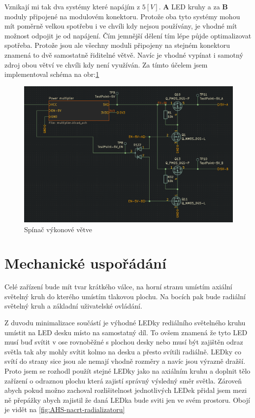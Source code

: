 Vznikají mi tak dva systémy které napájím z \(5 [V]\).
{\bf A} LED kruhy a za {\bf B} moduly připojené na modulovém konektoru.
Protože oba tyto systémy mohou mít poměrně velkou spotřebu i ve chvíli kdy nejsou používány, je vhodné mít možnost odpojit je od napájení.
Čím jemnější dělení tím lépe půjde optimalizovat spotřeba.
Protože jsou ale všechny moduli připojeny na stejném konektoru znamená to dvě samostatně řiditelné větvě.
Navíc je vhodné vypínat i samotný zdroj obou větví ve chvíli kdy není využíván.
Za tímto účelem jsem implementoval schéma na obr:\ref{fig:spinac_vikonove_vetve}

\begin{figure}[h!]
    \centering
    \includegraphics[width=\textwidth]{text/PraktickaCast/img/spinac_vikonove_vetve.png}
    \caption{Spínač výkonové větve}
    \label{fig:spinac_vikonove_vetve}
\end{figure}

\newpage

\section{Mechanické uspořádání}

Celé zařízení bude mít tvar krátkého válce, na horní stranu umístím axiální světelný kruh do kterého umístím tlakovou plochu.
Na bocích pak bude radiální světelný kruh a základní uživatelské ovládání.

Z duvodu minimalizace součástí je výhodné LEDky rediálního světelného kruhu umístit na LED desku místo na samostatný díl.
To ovšem znamená že tyto LED musí buď svítit v ose rovnoběžné s plochou desky nebo musí být zajištěn odraz světla tak aby mohly svítit kolmo na desku a přesto svítili radiálně.
LEDky co svítí do strany sice jsou ale nemají vhodně rozměry a navíc jsou výrazně dražší.
Proto jsem se rozhodl použít stejné LEDky jako na axiálním kruhu a doplnit tělo zařízení o odraznou plochu která zajistí správný výsledný směr světla.
Zároveň abych pokud možno zachoval rozlišitelnost jednotlivých LEDek přidal jsem mezi ně přepážky abych zajistil že daná LEDka bude sviti jen ve svém prostoru.
Obojí je vidět na \ref{fig:AHS-nacrt-radializatoru}


